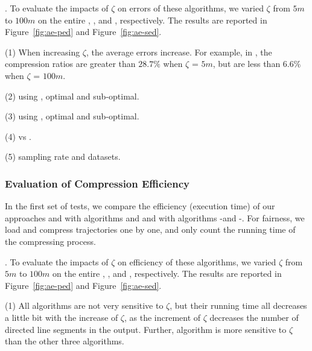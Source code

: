 .
To evaluate the impacts of $\zeta$ on errors of these algorithms, we varied $\zeta$ from $5m$ to $100m$ on the entire \taxi, \truck, \sercar and \geolife, respectively.
The results are reported in Figure~\ref{fig:ae-ped} and Figure~\ref{fig:ae-sed}.

\sstab (1) When increasing $\zeta$, the average errors increase. For example, in \sercar,
the compression ratios are greater than $28.7\%$ when $\zeta$ = $5m$, but are less than $6.6\%$ when $\zeta$ = $100m$.

\sstab (2) using \ped, optimal and sub-optimal.

\sstab (3) using \sed, optimal and sub-optimal.

\sstab (4) \ped vs \sed.

\sstab (5) sampling rate and datasets.



\subsubsection{Evaluation of Compression Efficiency}




In the first set of tests, we compare the efficiency (execution time) of our approaches \operb and \operba with algorithms \dpa and \fbqsa
and with algorithms -\operb and -\operba.
For fairness, we load and compress trajectories one by one, and only count the running time of the compressing process.

.
To evaluate the impacts of $\zeta$ on efficiency of these algorithms, we varied $\zeta$ from $5m$ to $100m$ on the entire \taxi, \truck, \sercar and \geolife, respectively.
The results are reported in Figure~\ref{fig:ae-ped} and Figure~\ref{fig:ae-sed}.

\sstab (1) 
All algorithms are not very sensitive to $\zeta$, but their running time all decreases a little bit with the increase of $\zeta$,
as the increment of $\zeta$ decreases the number of directed line segments in the output.
Further, algorithm \dpa is more sensitive to $\zeta$ than the other three algorithms.

